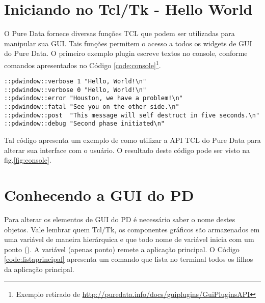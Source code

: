 \section{Iniciando no Tcl/Tk - Hello World}

O Pure Data fornece diversas funções TCL que podem ser utilizadas para
manipular sua GUI.
Tais funções permitem o acesso a todos os widgets de GUI do Pure Data.
O primeiro exemplo plugin escreve textos no console, conforme comandos
apresentados no Código \ref{code:console}\footnote{Exemplo retirado de \url{http://puredata.info/docs/guiplugins/GuiPluginsAPI}}.

\begin{lstlisting}[caption={Escrevendo no console},label={code:console}]
::pdwindow::verbose 1 "Hello, World!\n"
::pdwindow::verbose 0 "Hello, World!\n"
::pdwindow::error "Houston, we have a problem!\n"
::pdwindow::fatal "See you on the other side.\n"
::pdwindow::post  "This message will self destruct in five seconds.\n"
::pdwindow::debug "Second phase initiated\n"
\end{lstlisting}

Tal código apresenta um exemplo de como utilizar a API TCL do Pure Data para
alterar sua interface com o usuário.
O resultado deste código pode ser visto na fig.\ref{fig:console}.


\section{Conhecendo a GUI do PD}

Para alterar os elementos de GUI do PD é necessário saber o nome destes objetos.
Vale lembrar quem Tcl/Tk, os componentes gráficos são armazenados em uma variável
de maneira hierárquica e que todo nome de variável inicia com um ponto ().
A variável  (apenas ponto) remete a aplicação principal.
O Código \ref{code:listaprincipal} apresenta um comando que lista no terminal
todos os filhos da aplicação principal.

